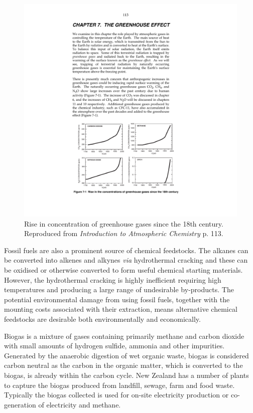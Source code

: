 \begin{figure}[h]  
\centering
\includegraphics[width = \textwidth]{../Figures/Greenhousegases.pdf}
\caption[Concentration of greenhouse gases]{Rise in concentration of greenhouse gases since the 18th century.  Reproduced from \emph{Introduction to Atmospheric Chemistry} p. 113.\cite{Jacobs1999}}
\label{Greenhousegases}
\end{figure}

Fossil fuels are also a prominent source of chemical feedstocks.\cite{Shilov1997}  The alkanes can be converted into alkenes and alkynes \emph{via} hydrothermal cracking and these can be oxidised or otherwise converted to form useful chemical starting materials.  However, the hydrothermal cracking is highly inefficient requiring high temperatures and producing a large range of undesirable by-products.\cite{Shilov1997}  The potential environmental damage from using fossil fuels, together with the mounting costs associated with their extraction, means alternative chemical feedstocks are desirable both environmentally and economically.\cite{Poliakoff2002, Crabtree2011b}

Biogas is a mixture of gases containing primarily methane and carbon dioxide with small amounts of hydrogen sulfide, ammonia and other impurities.\cite{Abatzoglou2009}  Generated by the anaerobic digestion of wet organic waste, biogas is considered carbon neutral as the carbon in the organic matter, which is converted to the biogas, is already within the carbon cycle.\cite{Amon2007}  New Zealand has a number of plants to capture the biogas produced from landfill, sewage, farm and food waste.  Typically the biogas collected is used for on-site electricity production or co-generation of electricity and methane.

